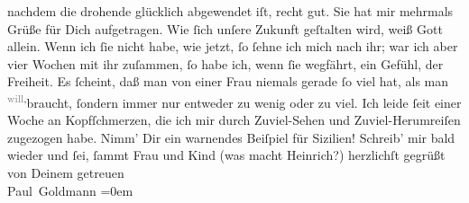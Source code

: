 \begin{ledgroupsized}[t]{13cm}
               nachdem die drohende \label{K_L03442-5v}\label{K_L03442-5h}{ } glücklich abgewendet iſt, recht gut. Sie hat mir
                   mehrmals Grüße für Dich aufgetragen. Wie
               ſich unſere Zukunft geſtalten wird, weiß Gott allein. Wenn {\pb} ich ſie nicht habe,
               wie jetzt, ſo ſehne ich mich nach ihr; war ich aber vier Wochen mit ihr zuſammen, ſo
               habe ich, wenn ſie wegfährt, ein Gefühl,  der Freiheit. Es ſcheint, daß man von einer Frau niemals gerade ſo viel hat,
               als man \substVorne{}\textsuperscript{\textcolor{gray}{will},}\substDazwischen{}braucht,\substHinten{} ſondern immer nur entweder zu wenig oder zu viel.\pend
           \pstart
           Ich leide ſeit einer Woche an Kopfſchmerzen, die ich mir durch Zuviel-Sehen und
               Zuviel-Herumreiſen zugezogen habe. Nimm’ Dir ein warnendes Beiſpiel für Sizilien!\pend
           \pstart
           Schreib’ mir bald wieder und ſei, ſammt Frau und Kind (was macht Heinrich?) herzlichſt
               gegrüßt von Deinem getreuen {\\[\baselineskip]}\spacefill\mbox{Paul Goldmann}\pend
           \leftskip=0em{}
         
         \endnumbering{}\end{ledgroupsized}  \newcommand{\dateiname}{L03442}\newcommand{\titel}{Paul Goldmann an Arthur Schnitzler, 8. 4. [1904]}\newcommand{\editorInnen}{Martin Anton Müller und Laura Untner}
      